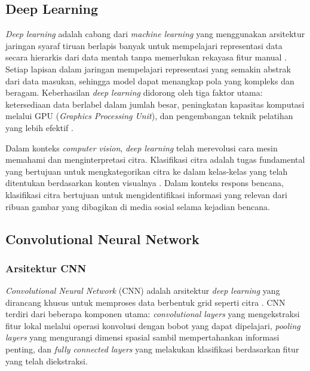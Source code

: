\subsection{Deep Learning} \label{II.Teori.DL}
\textit{Deep learning} adalah cabang dari \textit{machine learning}
yang menggunakan arsitektur jaringan syaraf tiruan berlapis banyak untuk
mempelajari representasi data secara hierarkis dari data mentah tanpa
memerlukan rekayasa fitur manual \cite{lecun2015deep}. Setiap lapisan
dalam jaringan mempelajari representasi yang semakin abstrak dari data
masukan, sehingga model dapat menangkap pola yang kompleks dan beragam.
Keberhasilan \textit{deep learning} didorong oleh tiga faktor utama:
ketersediaan data berlabel dalam jumlah besar, peningkatan kapasitas
komputasi melalui GPU (\textit{Graphics Processing Unit}), dan
pengembangan teknik pelatihan yang lebih efektif
\cite{lecun2015deep}. \par

Dalam konteks \textit{computer vision}, \textit{deep learning} telah
merevolusi cara mesin memahami dan menginterpretasi citra. Klasifikasi
citra adalah tugas fundamental yang bertujuan untuk mengkategorikan
citra ke dalam kelas-kelas yang telah ditentukan berdasarkan konten
visualnya \cite{lecun1998gradient}. Dalam konteks respons bencana,
klasifikasi citra bertujuan untuk mengidentifikasi informasi yang
relevan dari ribuan gambar yang dibagikan di media sosial selama
kejadian bencana. \par


\subsection{Convolutional Neural Network} \label{II.Teori.CNN}

\subsubsection{Arsitektur CNN}
\textit{Convolutional Neural Network} (CNN) adalah arsitektur
\textit{deep learning} yang dirancang khusus untuk memproses data
berbentuk grid seperti citra \cite{lecun1998gradient}. CNN terdiri dari
beberapa komponen utama: \textit{convolutional layers} yang mengekstraksi
fitur lokal melalui operasi konvolusi dengan bobot yang dapat dipelajari,
\textit{pooling layers} yang mengurangi dimensi spasial sambil
mempertahankan informasi penting, dan \textit{fully connected layers}
yang melakukan klasifikasi berdasarkan fitur yang telah diekstraksi. \par

